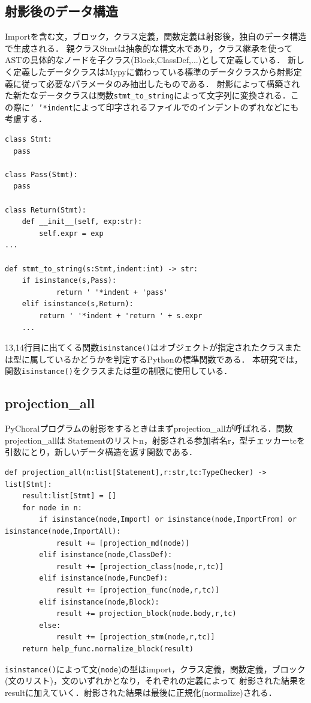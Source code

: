 \documentclass{thesis}
\begin{document}
\subsection{射影後のデータ構造}
Importを含む文，ブロック，クラス定義，関数定義は射影後，独自のデータ構造で生成される．
親クラス\textsf{Stmt}は抽象的な構文木であり，クラス継承を使ってASTの具体的なノードを子クラス(\textsf{Block,ClassDef,...})として定義している．
新しく定義したデータクラスはMypyに備わっている標準のデータクラスから射影定義に従って必要なパラメータのみ抽出したものである．
射影によって構築された新たなデータクラスは関数\texttt{stmt\_to\_string}によって文字列に変換される．この際に\texttt{' '*indent}によって印字されるファイルでのインデントのずれなどにも考慮する．
\begin{lstlisting}[caption=data.py,label=data]
class Stmt:
  pass

class Pass(Stmt):
  pass

class Return(Stmt):
    def __init__(self, exp:str):
        self.expr = exp
... 

def stmt_to_string(s:Stmt,indent:int) -> str:
    if isinstance(s,Pass):
            return ' '*indent + 'pass'
    elif isinstance(s,Return):
        return ' '*indent + 'return ' + s.expr
    ...
\end{lstlisting}

13,14行目に出てくる関数\texttt{isinstance()}はオブジェクトが指定されたクラスまたは型に属しているかどうかを判定するPythonの標準関数である．
本研究では，関数\texttt{isinstance()}をクラスまたは型の制限に使用している．
\subsection{projection\_all}
PyChoralプログラムの射影をするときはまず\textsf{projection\_all}が呼ばれる．関数\textsf{projection\_all}は
Statementのリスト\textsf{n}，射影される参加者名\textsf{r}，型チェッカー\textsf{tc}を引数にとり，新しいデータ構造を返す関数である．
\begin{lstlisting}[caption=projection\_all,label=pro.py]
def projection_all(n:list[Statement],r:str,tc:TypeChecker) -> list[Stmt]:
    result:list[Stmt] = []
    for node in n:
        if isinstance(node,Import) or isinstance(node,ImportFrom) or isinstance(node,ImportAll):
            result += [projection_md(node)]
        elif isinstance(node,ClassDef):
            result += [projection_class(node,r,tc)]
        elif isinstance(node,FuncDef):
            result += [projection_func(node,r,tc)]
        elif isinstance(node,Block):
            result += projection_block(node.body,r,tc)
        else:
            result += [projection_stm(node,r,tc)]
    return help_func.normalize_block(result)
\end{lstlisting}
\texttt{isinstance()}によって文(\texttt{node})の型はimport，クラス定義，関数定義，ブロック(文のリスト)，文のいずれかとなり，それぞれの定義によって
射影された結果をresultに加えていく．射影された結果は最後に正規化(normalize)される．
\end{document}

